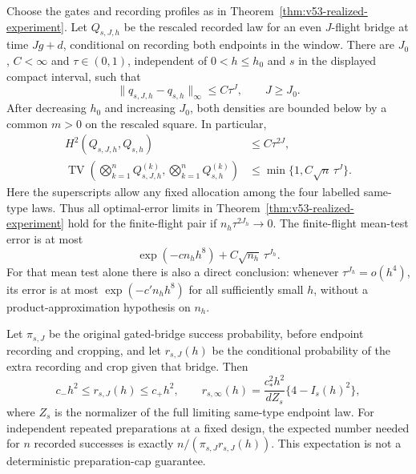 \begin{corollary}
\label{cor:v53-finite-flight}
Choose the gates and recording profiles as in
Theorem~\ref{thm:v53-realized-experiment}.  Let $Q_{s,J,h}$ be the rescaled
recorded law for an even $J$-flight bridge at time $Jg+d$, conditional on
recording both endpoints in the window.  There are $J_0$, $C<\infty$ and
$\tau\in(0,1)$, independent of $0<h\le h_0$ and $s$ in the displayed
compact interval, such that
\begin{equation}\label{eq:v53-finite-flight}
       \|q_{s,J,h}-q_{s,h}\|_\infty\le C\tau^J,
                  \qquad J\ge J_0.
\end{equation}
After decreasing $h_0$ and increasing $J_0$, both densities are bounded
below by a common $m>0$ on the rescaled square.  In particular,
\begin{align}
 H^2(Q_{s,J,h},Q_{s,h})&\le C\tau^{2J},
                                    \label{eq:v54-one-record-H}\\
 \operatorname{TV}\!\left(\bigotimes_{k=1}^n Q_{s,J,h}^{(k)},
                           \bigotimes_{k=1}^n Q_{s,h}^{(k)}\right)
   &\le \min\{1,C\sqrt n\,\tau^J\}.
                                    \label{eq:v54-product-TV}
\end{align}
Here the superscripts allow any fixed allocation among the four labelled
same-type laws.  Thus all optimal-error limits in
Theorem~\ref{thm:v53-realized-experiment} hold for the finite-flight pair
if $n_h\tau^{2J_h}\to0$.  The finite-flight mean-test error is at most
\begin{equation}\label{eq:v54-error-transfer}
          \exp(-cn_hh^8)+C\sqrt{n_h}\,\tau^{J_h}.
\end{equation}
For that mean test alone there is also a direct conclusion: whenever
$\tau^{J_h}=o(h^4)$, its error is at most $\exp(-c'n_hh^8)$ for all
sufficiently small $h$, without a product-approximation hypothesis on
$n_h$.

Let $\pi_{s,J}$ be the original gated-bridge success probability, before
endpoint recording and cropping, and let $r_{s,J}(h)$ be the conditional
probability of the extra recording and crop given that bridge.  Then
\begin{equation}\label{eq:v53-recording-mass}
 c_-h^2\le r_{s,J}(h)\le c_+h^2,\qquad
 r_{s,\infty}(h)=\frac{c_*^2h^2}{dZ_s}\{4-I_s(h)^2\},
\end{equation}
where $Z_s$ is the normalizer of the full limiting same-type endpoint law.
For independent repeated preparations at a fixed design, the expected
number needed for $n$ recorded successes is exactly
$n/(\pi_{s,J}r_{s,J}(h))$.  This expectation is not a deterministic
preparation-cap guarantee.
\end{corollary}

